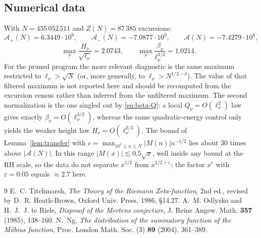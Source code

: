 \documentclass[11pt,reqno]{amsart}
\theoremstyle{plain}
\theoremstyle{definition}
\newcommand{\Ap}{\mathcal{A}_{+}}
\newcommand{\Am}{\mathcal{A}_{-}}
\newcommand{\Anet}{\mathcal{A}}
\newcommand{\eps}{\varepsilon}
\begin{document}
\subsection{Numerical data}
\label{subsec:data}

With $N=455\,052\,511$ and $Z(N)=87\,385$ excursions:
\[
  \Ap(N)=6.3449\cdot10^{9},\qquad
  \Am(N)=-7.0877\cdot10^{9},\qquad
  \Anet(N)=-7.4279\cdot10^{8},
\]
\[
  \max_\nu \frac{H_\nu}{\sqrt{\ell_\nu}}=2.0743,\qquad
  \max_\nu \frac{\beta_\nu}{\ell_\nu^{3/2}}=1.0214 .
\]
For the pruned program the more relevant diagnostic is the same maximum
restricted to $\ell_\nu>\sqrt N$ (or, more generally, to
$\ell_\nu>N^{1/2-\delta}$). The value of that filtered maximum is not
reported here and should be recomputed from the excursion census rather
than inferred from the unfiltered maximum.
The second normalization is the one singled out by
\eqref{eq:beta-Q}: a local $Q_\nu=O(\ell_\nu^2)$ law gives exactly
$\beta_\nu=O(\ell_\nu^{3/2})$, whereas the same quadratic-energy control
only yields the weaker height law $H_\nu=O(\ell_\nu^{2/3})$.
The bound of Lemma~\ref{lem:transfer} with
$c=\max_{10^3\le n\le N}|M(n)|n^{-1/2}$ lies about $30$ times above
$|\Anet(N)|$. In this range $|M(x)|\lesssim 0.5\sqrt{x}$, well inside any
bound at the RH scale, so the data do not separate $x^{1/2}$ from
$x^{1/2+\eps}$: the factor $x^{\eps}$ with $\eps=0.05$ equals
$\approx 2.7$ here.

\begin{thebibliography}{9}
 E.~C. Titchmarsh, \emph{The Theory of the Riemann
Zeta-function}, 2nd ed., revised by D.~R. Heath-Brown, Oxford Univ. Press,
1986, \S14.27.
 A.~M. Odlyzko and H.~J.~J. te Riele, \emph{Disproof of the
Mertens conjecture}, J. Reine Angew. Math. \textbf{357} (1985), 138--160.
 N.~Ng, \emph{The distribution of the summatory function of the
Möbius function}, Proc. London Math. Soc. (3) \textbf{89} (2004), 361--389.
\end{thebibliography}
\end{document}
